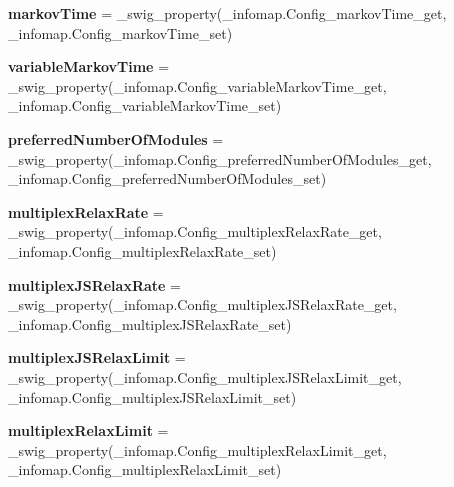 \begin{DoxyCompactItemize}
\item 
\mbox{\label{classinfomap_1_1Config_a1ce84b7ee46d8d7739bb443e8e7a000a}} 
{\bfseries markov\+Time} = \+\_\+swig\+\_\+property(\+\_\+infomap.\+Config\+\_\+markov\+Time\+\_\+get, \+\_\+infomap.\+Config\+\_\+markov\+Time\+\_\+set)
\item 
\mbox{\label{classinfomap_1_1Config_a2f0bcc1700c98623a131a1e4319e2c52}} 
{\bfseries variable\+Markov\+Time} = \+\_\+swig\+\_\+property(\+\_\+infomap.\+Config\+\_\+variable\+Markov\+Time\+\_\+get, \+\_\+infomap.\+Config\+\_\+variable\+Markov\+Time\+\_\+set)
\item 
\mbox{\label{classinfomap_1_1Config_a8ef624cdc60741bad1cf12755c7227b0}} 
{\bfseries preferred\+Number\+Of\+Modules} = \+\_\+swig\+\_\+property(\+\_\+infomap.\+Config\+\_\+preferred\+Number\+Of\+Modules\+\_\+get, \+\_\+infomap.\+Config\+\_\+preferred\+Number\+Of\+Modules\+\_\+set)
\item 
\mbox{\label{classinfomap_1_1Config_aede9dcf1788995b941ae8c8f75116b47}} 
{\bfseries multiplex\+Relax\+Rate} = \+\_\+swig\+\_\+property(\+\_\+infomap.\+Config\+\_\+multiplex\+Relax\+Rate\+\_\+get, \+\_\+infomap.\+Config\+\_\+multiplex\+Relax\+Rate\+\_\+set)
\item 
\mbox{\label{classinfomap_1_1Config_a64d261996bd9709e2ea7158aed3521b9}} 
{\bfseries multiplex\+J\+S\+Relax\+Rate} = \+\_\+swig\+\_\+property(\+\_\+infomap.\+Config\+\_\+multiplex\+J\+S\+Relax\+Rate\+\_\+get, \+\_\+infomap.\+Config\+\_\+multiplex\+J\+S\+Relax\+Rate\+\_\+set)
\item 
\mbox{\label{classinfomap_1_1Config_a7a7e0e96f8f49f2e1f5f83e99d27110a}} 
{\bfseries multiplex\+J\+S\+Relax\+Limit} = \+\_\+swig\+\_\+property(\+\_\+infomap.\+Config\+\_\+multiplex\+J\+S\+Relax\+Limit\+\_\+get, \+\_\+infomap.\+Config\+\_\+multiplex\+J\+S\+Relax\+Limit\+\_\+set)
\item 
\mbox{\label{classinfomap_1_1Config_aef8ecdbfd211acc4444af7c75d3d592a}} 
{\bfseries multiplex\+Relax\+Limit} = \+\_\+swig\+\_\+property(\+\_\+infomap.\+Config\+\_\+multiplex\+Relax\+Limit\+\_\+get, \+\_\+infomap.\+Config\+\_\+multiplex\+Relax\+Limit\+\_\+set)

\end{DoxyCompactItemize}
